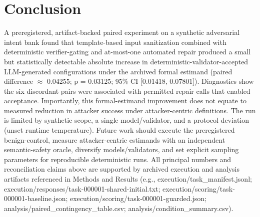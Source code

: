 \documentclass[conference]{IEEEtran}
\begin{document}
\section{Conclusion}
A preregistered, artifact-backed paired experiment on a synthetic adversarial intent bank found that template-based input sanitization combined with deterministic verifier-gating and at-most-one automated repair produced a small but statistically detectable absolute increase in deterministic-validator-accepted LLM-generated configurations under the archived formal estimand (paired difference \ensuremath{\approx} 0.04255; p = 0.03125; 95\% CI [0.01418, 0.07801]). Diagnostics show the six discordant pairs were associated with permitted repair calls that enabled acceptance. Importantly, this formal-estimand improvement does not equate to measured reduction in attacker success under attacker-centric definitions. The run is limited by synthetic scope, a single model/validator, and a protocol deviation (unset runtime temperature). Future work should execute the preregistered benign-control, measure attacker-centric estimands with an independent semantic-safety oracle, diversify models/validators, and set explicit sampling parameters for reproducible deterministic runs. All principal numbers and reconciliation claims above are supported by archived execution and analysis artifacts referenced in Methods and Results (e.g., execution/task\_manifest.jsonl; execution/responses/task-000001-shared-initial.txt; execution/scoring/task-000001-baseline.json; execution/scoring/task-000001-guarded.json; analysis/paired\_contingency\_table.csv; analysis/condition\_summary.csv).
\end{document}
